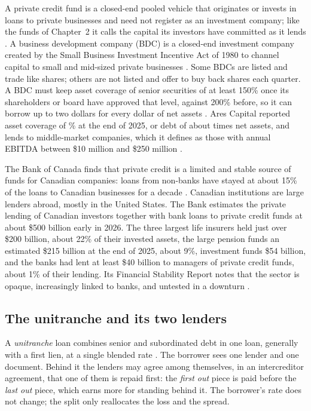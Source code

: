 \begin{chapterrefs}
A private credit fund is a closed-end pooled vehicle that originates or invests in loans to private
businesses and need not register as an investment company; like the funds of Chapter~2 it calls the
capital its investors have committed as it lends \parencite{cai2024}. A business
development company (BDC) is a closed-end investment company created by the Small Business Investment
Incentive Act of 1980 to channel capital to small and mid-sized private businesses \parencite{cai2024}.
Some BDCs are listed and trade like shares; others are not listed and offer to buy back shares each
quarter. A BDC must keep asset coverage of senior securities of at least 150\% once its shareholders or
board have approved that level, against 200\% before, so it can borrow up to two dollars for every
dollar of net assets \parencite{arcc2025}. Ares Capital reported asset coverage of
\dlCoverArcc\% at the end of 2025, or debt of about \dlDeArcc{} times net assets, and lends to
middle-market companies, which it defines as those with annual EBITDA between \$10 million and \$250
million \parencite{arcc2025}.

The Bank of Canada finds that private credit is a limited and stable source of funds for Canadian
companies: loans from non-banks have stayed at about 15\% of the loans to Canadian businesses for a decade
\parencite{boc2026private}. Canadian institutions are large lenders abroad, mostly in the United States. The
Bank estimates the private lending of Canadian investors together with bank loans to private credit funds
at about \$500 billion early in 2026. The three largest life insurers held just over \$200 billion, about
22\% of their invested assets, the large pension funds an estimated \$215 billion at the end of 2025, about
9\%, investment funds \$54 billion, and the banks had lent at least \$40 billion to managers of private
credit funds, about 1\% of their lending. Its Financial Stability Report notes that the sector is opaque,
increasingly linked to banks, and untested in a downturn \parencite{bocfsr2026}.

\subsection{The unitranche and its two lenders}

A \emph{unitranche} loan combines senior and subordinated debt in one loan, generally with a first lien,
at a single blended rate \parencite{arcc2025}. The borrower sees one lender and one document. Behind it the
lenders may agree among themselves, in an intercreditor agreement, that one of them is repaid first: the
\emph{first out} piece is paid before the \emph{last out} piece, which earns more for standing behind it.
The borrower's rate does not change; the split only reallocates the loss and the spread.


\end{chapterrefs}
